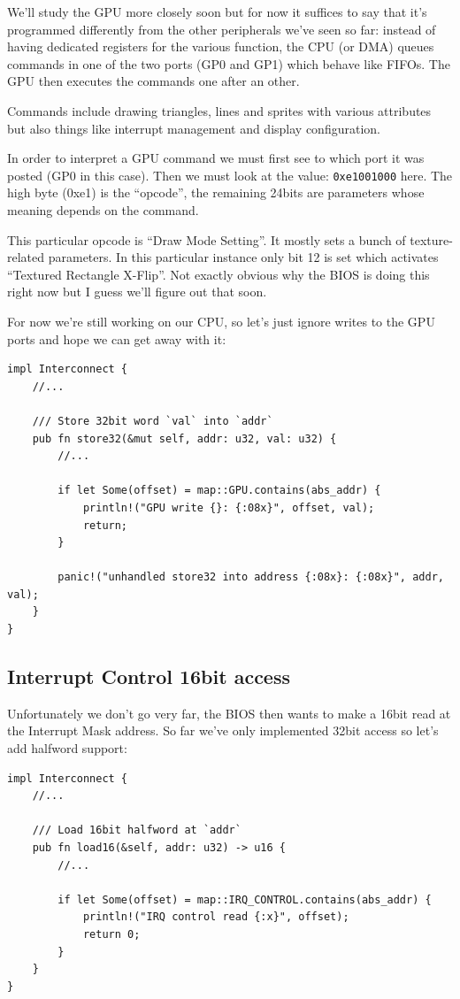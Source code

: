 \documentclass[a4paper]{article}
\newcommand{\code}[1] {\texttt{#1}}
\begin{document}
We'll study the GPU more closely soon but for now it suffices to say
that it's programmed differently from the other peripherals we've seen
so far: instead of having dedicated registers for the various
function, the CPU (or DMA) queues commands in one of the two ports
(GP0 and GP1) which behave like FIFOs. The GPU then executes the
commands one after an other.

Commands include drawing triangles, lines and sprites with various
attributes but also things like interrupt management and display
configuration.

In order to interpret a GPU command we must first see to which port it
was posted (GP0 in this case). Then we must look at the value:
\code{0xe1001000} here. The high byte (0xe1) is the ``opcode'', the
remaining 24bits are parameters whose meaning depends on the command.

This particular opcode is ``Draw Mode Setting''. It mostly sets a
bunch of texture-related parameters. In this particular instance only
bit 12 is set which activates ``Textured Rectangle X-Flip''. Not
exactly obvious why the BIOS is doing this right now but I guess we'll
figure out that soon.

For now we're still working on our CPU, so let's just ignore writes to
the GPU ports and hope we can get away with it:


\begin{lstlisting}
impl Interconnect {
    //...

    /// Store 32bit word `val` into `addr`
    pub fn store32(&mut self, addr: u32, val: u32) {
        //...

        if let Some(offset) = map::GPU.contains(abs_addr) {
            println!("GPU write {}: {:08x}", offset, val);
            return;
        }

        panic!("unhandled store32 into address {:08x}: {:08x}", addr, val);
    }
}
\end{lstlisting}

\subsection{Interrupt Control 16bit access}

Unfortunately we don't go very far, the BIOS then wants to make a
16bit read at the Interrupt Mask address. So far we've only
implemented 32bit access so let's add halfword support:

\begin{lstlisting}
impl Interconnect {
    //...

    /// Load 16bit halfword at `addr`
    pub fn load16(&self, addr: u32) -> u16 {
        //...

        if let Some(offset) = map::IRQ_CONTROL.contains(abs_addr) {
            println!("IRQ control read {:x}", offset);
            return 0;
        }
    }
}
\end{lstlisting}
\end{document}
